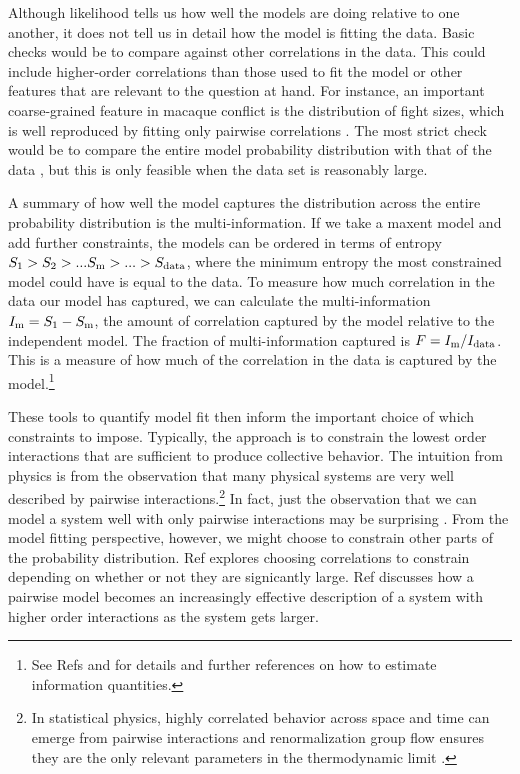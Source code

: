\documentclass[aps,prl,twocolumn,nofootinbib]{revtex4-1}
\begin{document}
Although likelihood tells us how well the models are doing relative to one another, it does not tell us in detail how the model is fitting the data.
Basic checks would be to compare against other correlations in the data.  This could include higher-order correlations than those used to fit the model or other features that are relevant to the question at hand. For instance, an important coarse-grained feature in  macaque conflict is the distribution of fight sizes, which is well reproduced by fitting only pairwise correlations \cite{Daniels:1cq}.
The most strict check would be to compare the entire model probability distribution with that of the data \cite{Lee:2015ev}, but this is only feasible when the data set is reasonably large.

A summary of how well the model captures the distribution across the entire probability distribution is the multi-information. If we take a maxent model and add further constraints, the models can be ordered in terms of entropy $S_{\rm 1}>S_{2}>...S_{\rm m}>...>S_{\rm data}$, where the minimum entropy the most constrained model could have is equal to the data. To measure how much correlation in the data our model has captured, we can calculate the multi-information $I_{\rm m} = S_{\rm 1}-S_{\rm m}$, the amount of correlation captured by the model relative to the independent model. The fraction of multi-information captured is $F=I_{\rm m}/I_{\rm data}$. This is a measure of how much of the correlation in the data is captured by the model.\footnote{See Refs \cite{Bialek:2012ueb} and \cite{Lee:2015ev} for details and further references on how to estimate information quantities.}

These tools to quantify model fit then inform the important choice of which constraints to impose. Typically, the approach is to constrain the lowest order interactions that are sufficient to produce collective behavior. The intuition from physics is from the observation that many physical systems are very well described by pairwise interactions.\footnote{In statistical physics, highly correlated behavior across space and time can emerge from pairwise interactions and renormalization group flow ensures they are the only relevant parameters in the thermodynamic limit \cite{}.} In fact, just the observation that we can model a system well with only pairwise interactions may be surprising \cite{Ranganathan:2007wz}. From the model fitting perspective, however, we might choose to constrain other parts of the probability distribution. Ref \cite{Ganmor:2011ct} explores choosing correlations to constrain depending on whether or not they are signicantly large. Ref \cite{Nemenman:2016kl} discusses how a pairwise model becomes an increasingly effective description of a system with higher order interactions as the system gets larger.
\end{document}
